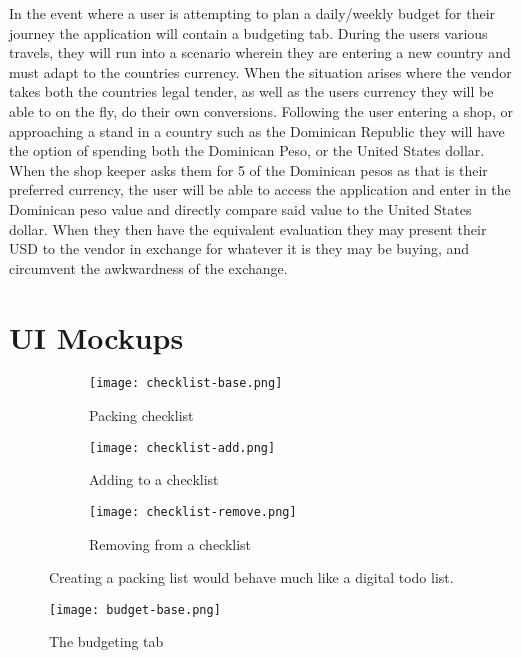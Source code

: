 \documentclass[12pt]{article}
\begin{document}
	In the event where a user is attempting to plan a daily/weekly budget for their journey the application will contain a budgeting tab.
	During the users various travels, they will run into a scenario wherein they are
	entering a new country and must adapt to the countries currency.
	When the situation arises where the vendor takes both the countries legal tender,
	as well as the users currency they will be able to on the fly, do their own conversions.
	Following the user entering a shop, or approaching a stand in a country such as the Dominican Republic
	they will have the option of spending both the Dominican Peso, or the United States dollar.
	When the shop keeper asks them for 5 of the Dominican pesos as that is their preferred currency,
	the user will be able to access the application and enter in the Dominican peso value and directly compare said value to the United States dollar.
	When they then have the equivalent evaluation they may present their USD to the vendor in exchange for whatever it is they may be buying,
	and circumvent the awkwardness of the exchange.

	\pagebreak

\section*{UI Mockups}

	\begin{figure}[h!]
		\centering
		\begin{subfigure}[h!]{0.2\linewidth}
			\texttt{[image: checklist-base.png]}
			\caption{Packing checklist}
			\label{fig:checklist-base}
		\end{subfigure}
		\begin{subfigure}[h]{0.2\linewidth}
			\texttt{[image: checklist-add.png]}
			\caption{Adding to a checklist}
			\label{fig:checklist-add}
		\end{subfigure}
		\begin{subfigure}[h]{0.2\linewidth}
			\texttt{[image: checklist-remove.png]}
			\caption{Removing from a checklist}
			\label{fig:checklist-remove}
		\end{subfigure}
		\caption{Creating a packing list would behave much like a digital todo list.}
	\end{figure}

	\begin{figure}[ht!]
		\texttt{[image: budget-base.png]}
		\caption{The budgeting tab}
		\label{fig:budget-base}
	\end{figure}
\end{document}

